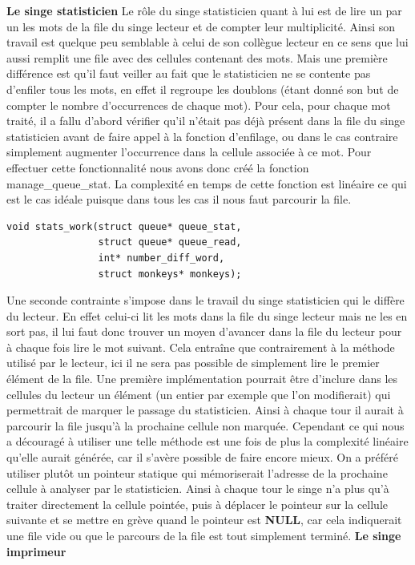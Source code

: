 \documentclass[12pt]{article}
\begin{document}
\bigbreak
\textbf{Le singe statisticien}
\bigbreak
Le rôle du singe statisticien quant à lui est de lire un par un les mots de la file du singe lecteur et de compter leur multiplicité. Ainsi son travail est quelque peu semblable à celui de son collègue lecteur en ce sens que lui aussi remplit une file avec des cellules contenant des mots. Mais une première différence est qu'il faut veiller au fait que le statisticien ne se contente pas d'enfiler tous les mots, en effet il regroupe les doublons (étant donné son but de compter le nombre d'occurrences de chaque mot). Pour cela, pour chaque mot traité, il a fallu d'abord vérifier qu'il n'était pas déjà présent dans la file du singe statisticien avant de faire appel à la fonction d'enfilage, ou dans le cas contraire simplement augmenter l'occurrence dans la cellule associée à ce mot. Pour effectuer cette fonctionnalité nous avons donc créé la fonction manage\_queue\_stat. La complexité en temps de cette fonction est linéaire ce qui est le cas idéale puisque dans tous les cas il nous faut parcourir la file.
\bigbreak
\begin{lstlisting}
void stats_work(struct queue* queue_stat,
                struct queue* queue_read,
                int* number_diff_word, 
                struct monkeys* monkeys);
\end{lstlisting}
\bigbreak
Une seconde contrainte s'impose dans le travail du singe statisticien qui le diffère du lecteur. En effet celui-ci lit les mots dans la file du singe lecteur mais ne les en sort pas, il lui faut donc trouver un moyen d'avancer dans la file du lecteur pour à chaque fois lire le mot suivant. Cela entraîne que contrairement à la méthode utilisé par le lecteur, ici il ne sera pas possible de simplement lire le premier élément de la file. Une première implémentation pourrait être d'inclure dans les cellules du lecteur un élément (un entier par exemple que l'on modifierait) qui permettrait de marquer le passage du statisticien. Ainsi à chaque tour il aurait à parcourir la file jusqu'à la prochaine cellule non marquée. Cependant ce qui nous a découragé à utiliser une telle méthode est une fois de plus la complexité linéaire qu'elle aurait générée, car il s'avère possible de faire encore mieux. On a préféré utiliser plutôt un pointeur statique qui mémoriserait l'adresse de la prochaine cellule à analyser par le statisticien. Ainsi à chaque tour le singe n'a plus qu'à traiter directement la cellule pointée, puis à déplacer le pointeur sur la cellule suivante et se mettre en grève quand le pointeur est \textbf{NULL}, car cela indiquerait une file vide ou que le parcours de la file est tout simplement terminé.
\bigbreak
\textbf{Le singe imprimeur}
\bigbreak
\end{document}
